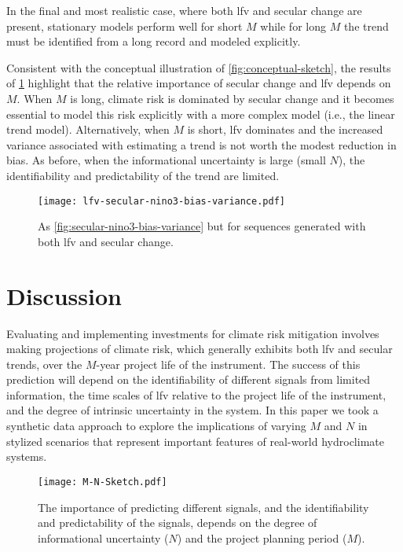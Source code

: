 \documentclass[
  draft,
  linenumbers
]{agujournal2019}
\begin{document}
In the final and most realistic case, where both \gls{lfv} and secular change are present, stationary models perform well for short $M$ while for long $M$ the trend must be identified from a long record and modeled explicitly.

Consistent with the conceptual illustration of \cref{fig:conceptual-sketch}, the results of \cref{fig:lfv-secular-nino3-bias-variance} highlight that the relative importance of secular change and \gls{lfv} depends on $M$.
When $M$ is long, climate risk is dominated by secular change and it becomes essential to model this risk explicitly with a more complex model (i.e.\@\xspace, the linear trend model).
Alternatively, when $M$ is short, \gls{lfv} dominates and the increased variance associated with estimating a trend is not worth the modest reduction in bias.
As before, when the informational uncertainty is large (small $N$), the identifiability and predictability of the trend are  limited.
\begin{figure}
  \centering
  \texttt{[image: lfv-secular-nino3-bias-variance.pdf]}
  \caption{
    As \cref{fig:secular-nino3-bias-variance} but for sequences generated with both \gls{lfv} and secular change.
  }\label{fig:lfv-secular-nino3-bias-variance}
\end{figure}


\clearpage
\section{Discussion}\label{sec:discussion-conclusions}

Evaluating and implementing investments for climate risk mitigation involves making projections of climate risk, which generally exhibits both \gls{lfv} and secular trends, over the $M$-year project life of the instrument.
The success of this prediction will depend on the identifiability of different signals from limited information, the time scales of \gls{lfv} relative to the project life of the instrument, and the degree of intrinsic uncertainty in the system.
In this paper we took a synthetic data approach to explore the implications of varying $M$ and $N$ in stylized scenarios that represent important features of real-world hydroclimate systems.

\begin{figure}
  \centering
  \texttt{[image: M-N-Sketch.pdf]}
  \caption{
    The importance of predicting different signals, and the identifiability and predictability of the signals, depends on the degree of informational uncertainty ($N$) and the project planning period ($M$).
  }\label{fig:m-n-sketch}
\end{figure}
\end{document}
